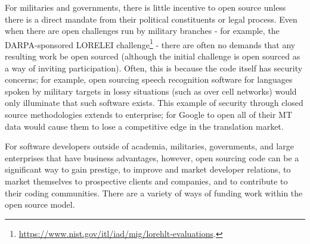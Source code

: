 For militaries and governments, there is little incentive to open source unless there is a direct mandate from their political constituents or legal process. Even when there are open challenges run by military branches - for example, the DARPA-sponsored LORELEI challenge\footnote{\href{https://www.nist.gov/itl/iad/mig/lorehlt-evaluations}{https://www.nist.gov/itl/iad/mig/lorehlt-evaluations}. } - there are often no demands that any resulting work be open sourced (although the initial challenge is open sourced as a way of inviting participation). Often, this is because the code itself has security concerns; for example, open sourcing speech recognition software for languages spoken by military targets in lossy situations (such as over cell networks) would only illuminate that such software exists. This example of security through closed source methodologies extends to enterprise; for Google to open all of their MT data would cause them to lose a competitive edge in the translation market.

For software developers outside of academia, militaries, governments, and large enterprises that have business advantages, however, open sourcing code can be a significant way to gain prestige, to improve and market developer relations, to market themselves to prospective clients and companies, and to contribute to their coding communities. There are a variety of ways of funding work within the open source model.

